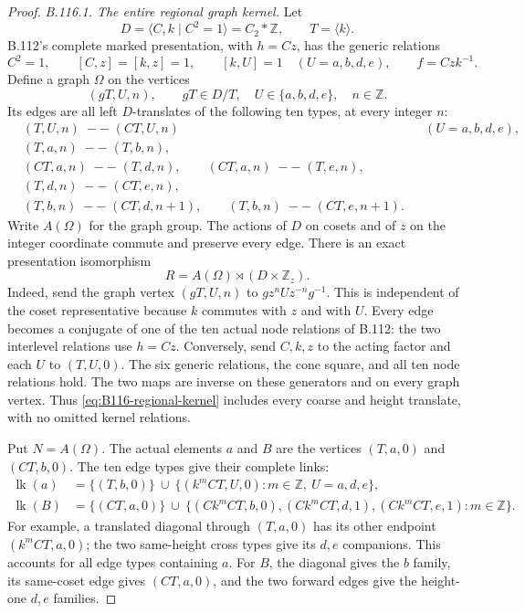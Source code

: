\begin{proof}
\emph{B.116.1. The entire regional graph kernel.}
Let
\[
 D=\langle C,k\mid C^2=1\rangle=C_2*\mathbb Z,
 \qquad T=\langle k\rangle.
\]
B.112's complete marked presentation, with $h=Cz$, has the generic
relations
\[
 C^2=1,\qquad [C,z]=[k,z]=1,\qquad
 [k,U]=1\quad(U=a,b,d,e),\qquad f=Czk^{-1}.
\]
Define a graph $\Omega$ on the vertices
\[
 (gT,U,n),\qquad gT\in D/T,\quad
 U\in\{a,b,d,e\},\quad n\in\mathbb Z.
\]
Its edges are all left $D$-translates of the following ten types,
at every integer $n$:
\begin{align*}
 &(T,U,n)\;--\;(CT,U,n) &&(U=a,b,d,e),\\
 &(T,a,n)\;--\;(T,b,n),\\
 &(CT,a,n)\;--\;(T,d,n),\qquad
   (CT,a,n)\;--\;(T,e,n),\\
 &(T,d,n)\;--\;(CT,e,n),\\
 &(T,b,n)\;--\;(CT,d,n+1),\qquad
   (T,b,n)\;--\;(CT,e,n+1).
\end{align*}
Write $A(\Omega)$ for the graph group. The actions of $D$ on cosets
and of $z$ on the integer coordinate commute and preserve every edge.
There is an exact presentation isomorphism
\begin{equation}\label{eq:B116-regional-kernel}
 R=A(\Omega)\rtimes(D\times\mathbb Z_z).
\end{equation}
Indeed, send the graph vertex $(gT,U,n)$ to
$gz^nUz^{-n}g^{-1}$. This is independent of the coset representative
because $k$ commutes with $z$ and with $U$. Every edge becomes a
conjugate of one of the ten actual node relations of B.112: the two
interlevel relations use $h=Cz$. Conversely, send $C,k,z$ to the
acting factor and each $U$ to $(T,U,0)$. The six generic relations,
the cone square, and all ten node relations hold. The two maps are
inverse on these generators and on every graph vertex. Thus
\eqref{eq:B116-regional-kernel} includes every coarse and height
translate, with no omitted kernel relations.

Put $N=A(\Omega)$. The actual elements $a$ and $B$ are the vertices
$(T,a,0)$ and $(CT,b,0)$. The ten edge types give their complete links:
\begin{align}
 \operatorname{lk}(a)
  &=\{(T,b,0)\}\ \cup\
    \{(k^mCT,U,0):m\in\mathbb Z,\ U=a,d,e\},
    \label{eq:B116-link-a}\\
 \operatorname{lk}(B)
  &=\{(CT,a,0)\}\ \cup\
    \{(Ck^mCT,b,0),(Ck^mCT,d,1),(Ck^mCT,e,1):m\in\mathbb Z\}.
    \label{eq:B116-link-B}
\end{align}
For example, a translated diagonal through $(T,a,0)$ has its other
endpoint $(k^mCT,a,0)$; the two same-height cross types give its
$d,e$ companions. This accounts for all edge types containing $a$.
For $B$, the diagonal gives the $b$ family, its same-coset edge gives
$(CT,a,0)$, and the two forward edges give the height-one $d,e$ families.


\end{proof}
